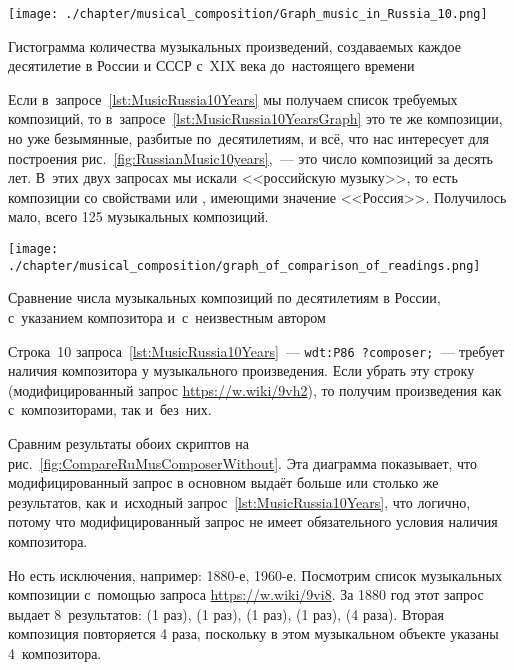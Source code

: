 \begin{marginfigure}[0\baselineskip]
	\texttt{[image: ./chapter/musical\_composition/Graph\_music\_in\_Russia\_10.png]}
    \vspace{-10pt}
	\caption{Гистограмма количества музыкальных произведений, 
             создаваемых каждое десятилетие в России и СССР с~XIX века до~настоящего времени}%
	\label{fig:RussianMusic10years}%
\end{marginfigure}


Если в~запросе~\ref{lst:MusicRussia10Years} мы получаем список требуемых композиций, 
то   в~запросе~\ref{lst:MusicRussia10YearsGraph} это те же композиции, но уже безымянные, 
разбитые по~десятилетиям, и всё, что нас интересует для построения рис.~\ref{fig:RussianMusic10years},~--- 
это число композиций за десять лет. 
В~этих двух запросах мы искали <<российскую музыку>>, то есть композиции со свойствами 
 или 
, имеющими значение <<Россия>>. 
Получилось мало, всего 125 музыкальных композиций. 

\begin{marginfigure}[0\baselineskip]
	\texttt{[image: ./chapter/musical\_composition/graph\_of\_comparison\_of\_readings.png]}
	\caption{Сравнение числа музыкальных композиций по десятилетиям в России,  
             с~указанием композитора и~с~неизвестным автором}%
	\label{fig:CompareRuMusComposerWithout}%
\end{marginfigure}

Строка~10 запроса~\ref{lst:MusicRussia10Years}~---  
\lstinline|wdt:P86 ?composer;|~--- 
требует наличия композитора у музыкального произведения. 
Если убрать эту строку (модифицированный запрос \href{https://w.wiki/9vh2}
                                                     {https://w.wiki/9vh2}), 
то получим произведения как с~композиторами, так и~без~них. 

Сравним результаты обоих скриптов на рис.~\ref{fig:CompareRuMusComposerWithout}. 
Эта диаграмма показывает, что модифицированный запрос 
в основном выдаёт больше или столько же результатов, 
как и~исходный запрос~\ref{lst:MusicRussia10Years}, 
что логично, потому что модифицированный запрос не имеет обязательного условия наличия композитора. 

Но есть исключения, например: 1880-е, 1960-е. 
Посмотрим список музыкальных композиции с~помощью запроса \href{https://w.wiki/9vi8}
                                                               {https://w.wiki/9vi8}. 
За 1880 год этот запрос выдает 8~результатов: 
 (1 раз), 
 (1 раз), 
 (1 раз), 
 (1 раз), 
 (4 раза). 
Вторая композиция повторяется 4 раза, поскольку в этом музыкальном объекте указаны 4~композитора.


